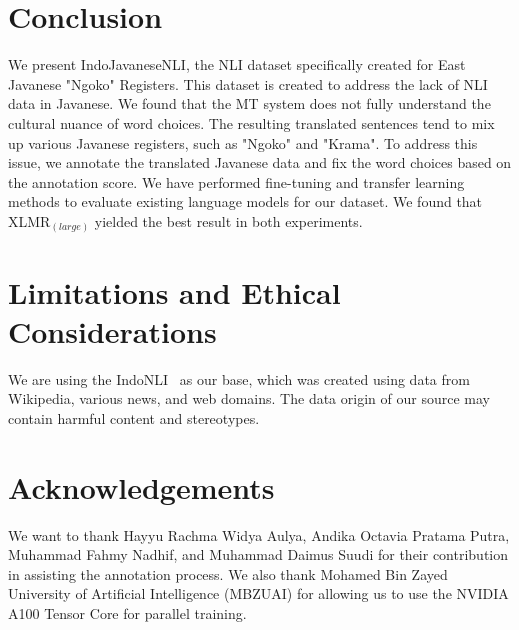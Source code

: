 \documentclass[a4paper, conference]{IEEEtran}
\begin{document}
\section{Conclusion}
We present IndoJavaneseNLI, the NLI dataset specifically created for East Javanese "Ngoko" Registers. This dataset is created to address the lack of NLI data in Javanese. We found that the MT system does not fully understand the cultural nuance of word choices. The resulting translated sentences tend to mix up various Javanese registers, such as "Ngoko" and "Krama". To address this issue, we annotate the translated Javanese data and fix the word choices based on the annotation score.
We have performed fine-tuning and transfer learning methods to evaluate existing language models for our dataset. We found that XLMR$_{(large)}$ yielded the best result in both experiments.

\section{Limitations and Ethical Considerations}
We are using the IndoNLI~\cite{Mahendra2021} as our base, which was created using data from Wikipedia, various news, and web domains. The data origin of our source may contain harmful content and stereotypes.

\section*{Acknowledgements}
We want to thank Hayyu Rachma Widya Aulya, Andika Octavia Pratama Putra, Muhammad Fahmy Nadhif, and Muhammad Daimus Suudi for their contribution in assisting the annotation process. We also thank Mohamed Bin Zayed University of Artificial Intelligence (MBZUAI) for allowing us to use the NVIDIA A100 Tensor Core for parallel training.



\end{document}
